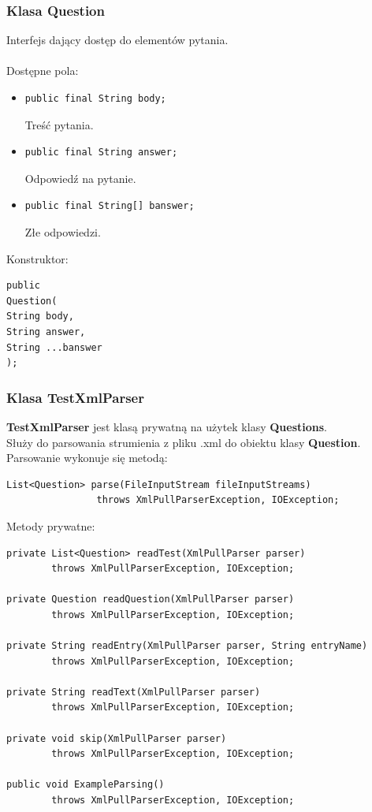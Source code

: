 \documentclass[12pt, a4paper]{article}
\begin{document}
\subsubsection{Klasa Question}
Interfejs dający dostęp do elementów pytania.\\\\
Dostępne pola:
\begin{itemize}
\item\begin{lstlisting}
public final String body;
\end{lstlisting}
Treść pytania.
\item\begin{lstlisting}
public final String answer;
\end{lstlisting}
Odpowiedź na pytanie.
\item\begin{lstlisting}
public final String[] banswer;
\end{lstlisting}
Złe odpowiedzi.
\end{itemize}
Konstruktor:
\begin{lstlisting}
public
Question(
String body,
String answer,
String ...banswer
);
\end{lstlisting}
\subsubsection{Klasa TestXmlParser}
\textbf{TestXmlParser} jest klasą prywatną na użytek klasy \textbf{Questions}.\\
Służy do parsowania strumienia z pliku .xml do obiektu klasy \textbf{Question}.\\
Parsowanie wykonuje się metodą:
\begin{lstlisting}
List<Question> parse(FileInputStream fileInputStreams)
                throws XmlPullParserException, IOException;
\end{lstlisting}
Metody prywatne:
\begin{lstlisting}
private List<Question> readTest(XmlPullParser parser)
        throws XmlPullParserException, IOException;

private Question readQuestion(XmlPullParser parser)
        throws XmlPullParserException, IOException;

private String readEntry(XmlPullParser parser, String entryName)
        throws XmlPullParserException, IOException;

private String readText(XmlPullParser parser)
        throws XmlPullParserException, IOException;

private void skip(XmlPullParser parser)
        throws XmlPullParserException, IOException;

public void ExampleParsing()
        throws XmlPullParserException, IOException;
\end{lstlisting}
\end{document}
